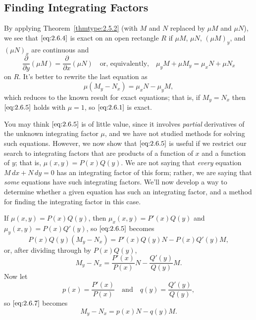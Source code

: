 \documentclass{ximera}
\begin{document}
\subsection*{Finding Integrating Factors}

By applying Theorem~\ref{thmtype:2.5.2} (with $M$ and $N$ replaced by $\mu M$
and $\mu N$), we see that $\eqref{eq:2.6.4}$ is exact on an open rectangle
$R$ if $\mu M$, $\mu N$, $(\mu M)_y$, and $(\mu N)_x$ are continuous
and
$$
\frac{\partial}{\partial y}(\mu M)=\frac{\partial}{\partial x}
(\mu N) \quad\text{or, equivalently,}\quad
\mu_yM+\mu M_y=\mu_xN+\mu N_x
$$
on $R$. It's better to rewrite the last equation as
\begin{equation} \label{eq:2.6.5}
\mu(M_y-N_x)=\mu_xN-\mu_yM,
\end{equation}
which  reduces to  the known result for exact equations;
that is, if $M_y=N_x$ then $\eqref{eq:2.6.5}$ holds with $\mu=1$, so
$\eqref{eq:2.6.1}$ is exact.

You may think $\eqref{eq:2.6.5}$ is of little value, since it involves
\textit{partial} derivatives of the unknown integrating factor $\mu$,
and we have not studied methods for solving such equations. However,
we now show that $\eqref{eq:2.6.5}$ is useful if we restrict our search
to integrating factors that are products of a function of
$x$ and a function of $y$; that is,
$\mu(x,y)=P(x)Q(y)$.
We are not saying that \textit{every} equation
 $M\,dx+N\,dy=0$ has an integrating factor of this
form; rather, we are saying that \textit{some} equations have
such integrating
factors.  We'll now develop a way to determine whether a given
equation has such an integrating factor, and a method for finding the
integrating factor in this case.

If $\mu(x,y)=P(x)Q(y)$, then $\mu_x(x,y)=P'(x)Q(y)$ and
$\mu_y(x,y)=P(x)Q'(y)$, so $\eqref{eq:2.6.5}$ becomes
\begin{equation} \label{eq:2.6.6}
P(x)Q(y)(M_y-N_x)=P'(x)Q(y)N-P(x)Q'(y)M,
\end{equation}
or, after dividing through by $P(x)Q(y)$,
\begin{equation} \label{eq:2.6.7}
M_y-N_x=\frac{P'(x)}{P(x)}N-\frac{Q'(y)}{Q(y)}M.
\end{equation}
Now let
$$
p(x)=\frac{P'(x)}{P(x)}\quad \text{and}\quad q(y)=\frac{Q'(y)}{Q(y)},
$$
so $\eqref{eq:2.6.7}$ becomes
\begin{equation} \label{eq:2.6.8}
M_y-N_x=p(x)N-q(y)M.
\end{equation}
\end{document}
